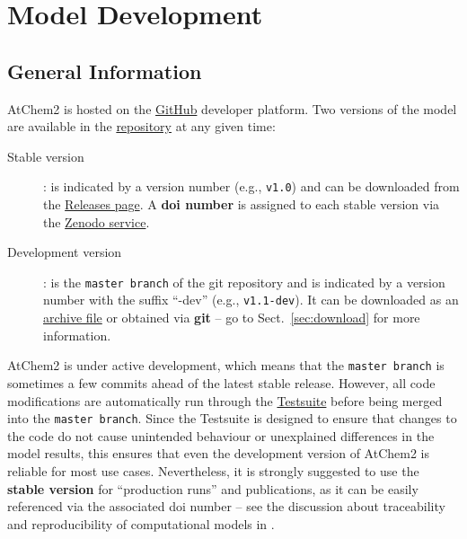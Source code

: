 %
%
%
%

\chapter{Model Development} \label{ch:development}

\section{General Information} \label{sec:general-information}

AtChem2 is hosted on the \href{https://github.com}{GitHub} developer
platform. Two versions of the model are available in the
\href{https://github.com/AtChem/AtChem2}{repository} at any given
time:

\begin{description}
\item[Stable version]: is indicated by a version number
  (e.g., \texttt{v1.0}) and can be downloaded from the
  \href{https://github.com/AtChem/AtChem2/releases}{Releases page}.
  A \textbf{doi number} is assigned to each stable version via the
  \href{https://zenodo.org}{Zenodo service}.
\item[Development version]: is the \texttt{master\ branch} of the git
  repository and is indicated by a version number with the suffix
  ``-dev'' (e.g., \texttt{v1.1-dev}). It can be downloaded as an
  \href{https://github.com/AtChem/AtChem2/archive/master.zip}{archive file}
  or obtained via \textbf{git} -- go to Sect.~\ref{sec:download} for
  more information.
\end{description}

AtChem2 is under active development, which means that the
\texttt{master\ branch} is sometimes a few commits ahead of the latest
stable release. However, all code modifications are automatically run
through the \hyperref[sec:test-suite]{Testsuite} before being merged
into the \texttt{master\ branch}. Since the Testsuite is designed to
ensure that changes to the code do not cause unintended behaviour or
unexplained differences in the model results, this ensures that even
the development version of AtChem2 is reliable for most use
cases. Nevertheless, it is strongly suggested to use the
\textbf{stable version} for ``production runs'' and publications, as
it can be easily referenced via the associated doi number -- see the
discussion about traceability and reproducibility of computational
models in \citet{sommariva_2020}.

